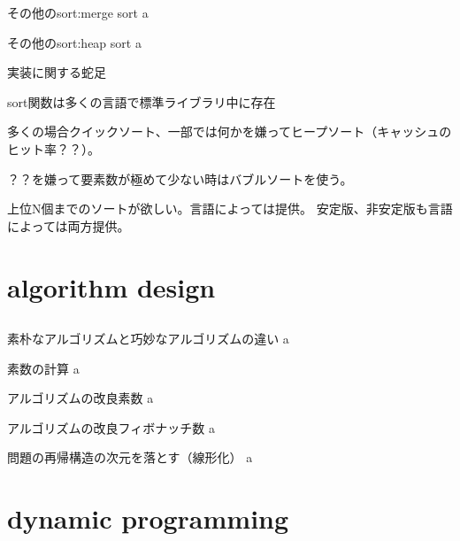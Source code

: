 \documentclass{beamer}
\begin{document}
\begin{frame}[fragile]{その他のsort:merge sort}{}
a
\end{frame}

\begin{frame}[fragile]{その他のsort:heap sort}{}
a
\end{frame}

\begin{frame}[fragile]{実装に関する蛇足}{}

sort関数は多くの言語で標準ライブラリ中に存在

多くの場合クイックソート、一部では何かを嫌ってヒープソート（キャッシュのヒット率？？）。

？？を嫌って要素数が極めて少ない時はバブルソートを使う。

上位N個までのソートが欲しい。言語によっては提供。
安定版、非安定版も言語によっては両方提供。

\end{frame}


\section{algorithm design}		%
\subsection{}

\begin{frame}[fragile]{素朴なアルゴリズムと巧妙なアルゴリズムの違い}{}
a
\end{frame}

\begin{frame}[fragile]{素数の計算}{}
a
\end{frame}

\begin{frame}[fragile]{アルゴリズムの改良}{素数}
a
\end{frame}

\begin{frame}[fragile]{アルゴリズムの改良}{フィボナッチ数}
a
\end{frame}

\begin{frame}[fragile]{問題の再帰構造の次元を落とす（線形化）}{}
a
\end{frame}

\section{dynamic programming}		%
\end{document}
